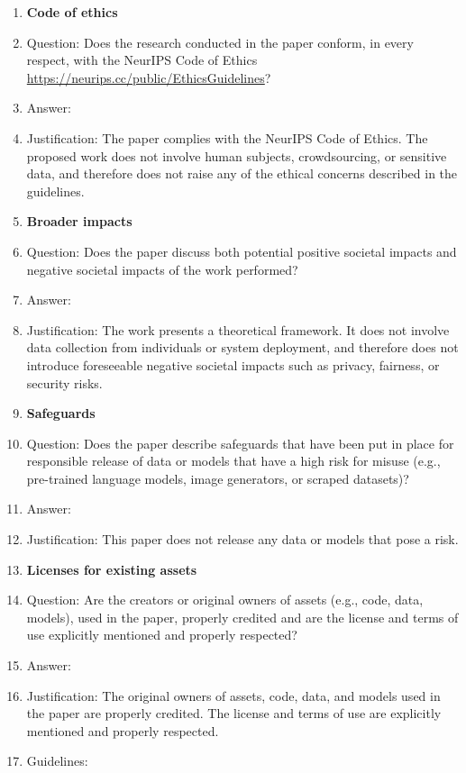 \begin{enumerate}
	
	\item {\bf Code of ethics}
	\item[] Question: Does the research conducted in the paper conform, in every respect, with the NeurIPS Code of Ethics \url{https://neurips.cc/public/EthicsGuidelines}?
	\item[] Answer: \answerYes{} %
	\item[] Justification: The paper complies with the NeurIPS Code of Ethics. The proposed work does not involve human subjects, crowdsourcing, or sensitive data, and therefore does not raise any of the ethical concerns described in the guidelines.


	\item {\bf Broader impacts}
	\item[] Question: Does the paper discuss both potential positive societal impacts and negative societal impacts of the work performed?
	\item[] Answer: \answerNA{} %
	\item[] Justification: The work presents a theoretical framework. It does not involve data collection from individuals or system deployment, and therefore does not introduce foreseeable negative societal impacts such as privacy, fairness, or security risks.

	
	\item {\bf Safeguards}
	\item[] Question: Does the paper describe safeguards that have been put in place for responsible release of data or models that have a high risk for misuse (e.g., pre-trained language models, image generators, or scraped datasets)?
	\item[] Answer: \answerNA{} %
	\item[] Justification: This paper does not release any data or models that pose a risk.

	
	\item {\bf Licenses for existing assets}
	\item[] Question: Are the creators or original owners of assets (e.g., code, data, models), used in the paper, properly credited and are the license and terms of use explicitly mentioned and properly respected?
	\item[] Answer: \answerYes{} %
	\item[] Justification: The original owners of assets, code, data, and models used in the paper are properly credited. The license and terms of use are explicitly mentioned and properly respected.
	\item[] Guidelines:
	

\end{enumerate}

